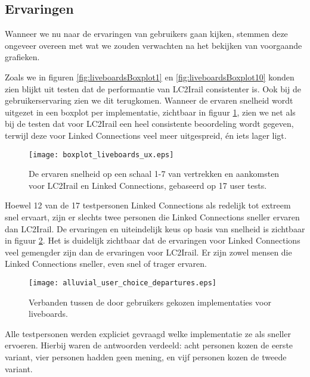 \subsection{Ervaringen}
Wanneer we nu naar de ervaringen van gebruikers gaan kijken, stemmen deze ongeveer overeen met wat we zouden verwachten na het bekijken van voorgaande grafieken. 

Zoals we in figuren \ref{fig:liveboardsBoxplot1} en \ref{fig:liveboardsBoxplot10} konden zien blijkt uit testen dat de performantie van LC2Irail consistenter is. Ook bij de gebruikerservaring zien we dit terugkomen. Wanneer de ervaren snelheid wordt uitgezet in een boxplot per implementatie, zichtbaar in figuur \ref{fig:liveboardsUx}, zien we net als bij de testen dat voor LC2Irail een heel consistente beoordeling wordt gegeven, terwijl deze voor Linked Connections veel meer uitgespreid, én iets lager ligt.

\begin{figure}[h]
	\centering
	\texttt{[image: boxplot\_liveboards\_ux.eps]}
	\caption[Ervaren snelheid van liveboards]{De ervaren snelheid op een schaal 1-7 van vertrekken en aankomsten voor LC2Irail en Linked Connections, gebaseerd op 17 user tests.}
	\label{fig:liveboardsUx}
\end{figure}

Hoewel 12 van de 17 testpersonen Linked Connections als redelijk tot extreem snel ervaart, zijn er slechts twee personen die Linked Connections sneller ervaren dan LC2Irail. De ervaringen en uiteindelijk keus op basis van snelheid is zichtbaar in figuur \ref{fig:alluvialUserChoicesLiveboards}. Het is duidelijk zichtbaar dat de ervaringen voor Linked Connections veel gemengder zijn dan de ervaringen voor LC2Irail. Er zijn zowel mensen die Linked Connections sneller, even snel of trager ervaren. 

\begin{figure}[ht]
	\centering
	\texttt{[image: alluvial\_user\_choice\_departures.eps]}
	\caption[Door gebruikers gekozen implementatie voor liveboards]{Verbanden tussen de door gebruikers gekozen implementaties voor liveboards. }
	\label{fig:alluvialUserChoicesLiveboards}
\end{figure}

Alle testpersonen werden expliciet gevraagd welke implementatie ze als sneller ervoeren. Hierbij waren de antwoorden verdeeld: acht personen kozen de eerste variant, vier personen hadden geen mening, en vijf personen kozen de tweede variant.

